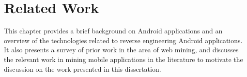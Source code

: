 \chapter{Related Work}
\label{ch:related_work_chapter}
This chapter provides a brief background on Android applications and an overview of the technologies related to reverse engineering Android applications.
It also presents a survey of prior work in the area of web mining, and discusses the relevant work in mining mobile applications in the literature to motivate the discussion on the work presented in this dissertation.










